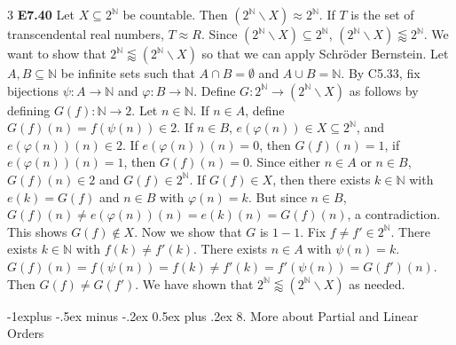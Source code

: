 \documentclass[10pt, landscape]{article}
\makeatletter
\renewcommand{\section}{\@startsection{section}{1}{0mm}%
                                {-1ex plus -.5ex minus -.2ex}%
                                {0.5ex plus .2ex}%
                                {\normalfont\large\bfseries}}
\renewcommand{\section}{\@startsection{section}{2}{0mm}%
                                {-1explus -.5ex minus -.2ex}%
                                {0.5ex plus .2ex}%
                                {\normalfont\normalsize\bfseries}}
\renewcommand{\subsection}{\@startsection{subsection}{3}{0mm}%
                                {-1ex plus -.5ex minus -.2ex}%
                                {1ex plus .2ex}%
                                {\normalfont\small\bfseries}}%
\makeatother
\begin{document}
\begin{multicols*}{3}
\textbf{E7.40} Let $X \subseteq 2^\mathbb{N}$ be countable. Then $(2^\mathbb{N} \backslash X) \approx 2^\mathbb{N}$. If $T$ is the set of transcendental real numbers, $T \approx R$. Since $(2^\mathbb{N} \backslash X) \subseteq 2^\mathbb{N}$, $(2^\mathbb{N} \backslash X) \lessapprox 2^\mathbb{N}$. We want to show that $2^\mathbb{N} \lessapprox (2^\mathbb{N} \backslash X)$ so that we can apply Schröder Bernstein. Let $A, B \subseteq \mathbb{N}$ be infinite sets such that $A \cap B = \emptyset$ and $A \cup B = \mathbb{N}$. By C5.33, fix bijections $\psi : A \rightarrow \mathbb{N}$ and $\varphi : B \rightarrow \mathbb{N}$. Define $G:2^\mathbb{N} \rightarrow (2^\mathbb{N} \backslash X)$ as follows by defining $G(f): \mathbb{N} \rightarrow 2$. Let $n \in \mathbb{N}$. If $n \in A$, define $G(f)(n)=f(\psi(n))\in 2$. If $n \in B$, $e(\varphi(n))\in X \subseteq 2^\mathbb{N}$, and $e(\varphi(n))(n)\in 2$. If $e(\varphi(n))(n)=0$, then $G(f)(n)=1$, if $e(\varphi(n))(n)=1$, then $G(f)(n)=0$. Since either $n \in A$ or $n \in B$, $G(f)(n)\in2$ and $G(f) \in 2^\mathbb{N}$. If $G(f) \in X$, then there exists $k \in \mathbb{N}$ with $e(k)=G(f)$ and $n \in B$ with $\varphi(n)=k$. But since $n \in B$, $G(f)(n) \neq e(\varphi(n))(n)=e(k)(n)=G(f)(n)$, a contradiction. This shows $G(f) \notin X$. Now we show that $G$ is $1-1$. Fix $f \neq f' \in 2^\mathbb{N}$. There exists $k \in \mathbb{N}$ with $f(k) \neq f'(k)$. There exists $n \in A$ with $\psi(n)=k$. $G(f)(n)=f(\psi(n))=f(k)\neq f'(k) =f'(\psi(n))=G(f')(n)$. Then $G(f)\neq G(f')$. We have shown that $2^\mathbb{N} \lessapprox (2^\mathbb{N}\backslash X)$ as needed.

\section{8. More about Partial and Linear Orders}




\end{multicols*}
\end{document}
